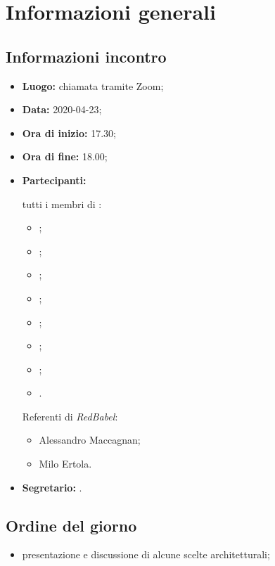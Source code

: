 \section{Informazioni generali}
\subsection{Informazioni incontro}
\begin{itemize}
	\item \textbf{Luogo:} chiamata tramite Zoom;
	\item \textbf{Data:} 2020-04-23;
	\item \textbf{Ora di inizio:} 17.30;
	\item \textbf{Ora di fine:} 18.00;
	\item \textbf{Partecipanti:}

		tutti i membri di \Gruppo:
		\begin{itemize}
			\item \VB;
			\item \LB;
			\item \NF;
			\item \EG;
			\item \FJ;
			\item \MP;
			\item \AS;
			\item \AZ.
		\end{itemize}

		Referenti di \textit{RedBabel}:
		\begin{itemize}
			\item Alessandro Maccagnan;
			\item Milo Ertola.
		\end{itemize}
	\item \textbf{Segretario:} \VB.
\end{itemize}

\subsection{Ordine del giorno}
\begin{itemize}
	\item presentazione e discussione di alcune scelte architetturali;
\end{itemize}
